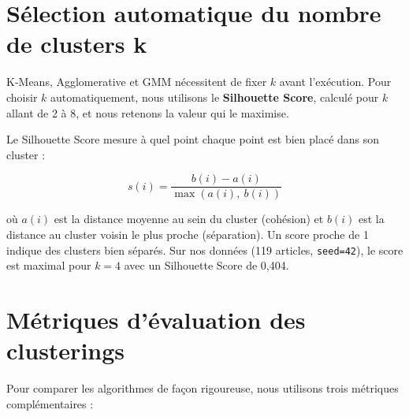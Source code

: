 \documentclass[a4paper, 12pt, twoside]{report}
\begin{document}
\section{Sélection automatique du nombre de clusters k}
K-Means, Agglomerative et GMM nécessitent de fixer $k$ avant l'exécution.
Pour choisir $k$ automatiquement, nous utilisons le \textbf{Silhouette Score},
calculé pour $k$ allant de 2 à 8, et nous retenons la valeur qui le maximise.

Le Silhouette Score mesure à quel point chaque point est bien placé dans son
cluster :

\begin{equation}
    s(i) = \frac{b(i) - a(i)}{\max(a(i),\ b(i))}
\end{equation}

où $a(i)$ est la distance moyenne au sein du cluster (cohésion) et $b(i)$ est
la distance au cluster voisin le plus proche (séparation). Un score proche
de 1 indique des clusters bien séparés.
Sur nos données (119 articles, \texttt{seed=42}),
le score est maximal pour $k = 4$ avec un Silhouette Score de 0,404.

\section{Métriques d'évaluation des clusterings}
Pour comparer les algorithmes de façon rigoureuse, nous utilisons trois métriques complémentaires :
\begin{table}[h]
\centering
{}
\caption{Métriques d'évaluation des algorithmes de clustering}
\label{tab:metriques}
\end{table}
\end{document}
